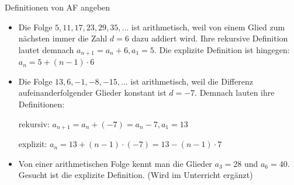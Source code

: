 \begin{bsp} {Definitionen von AF angeben}{}
    \begin{itemize}
        \item Die Folge $5,11,17,23,29,35,\dots $ ist arithmetisch, weil von einem Glied zum nächsten immer die Zahl $d=6$ dazu addiert wird.
        Ihre rekursive Definition lautet demnach $a_{n+1}=a_n + 6, a_1=5$. Die explizite Definition ist hingegen: $a_n=5+(n-1)\cdot 6$
        \item Die Folge $13,6,-1,-8,-15,\dots $ ist arithmetisch, weil die Differenz aufeinanderfolgender Glieder konstant ist $d=-7$. Demnach lauten ihre Definitionen:
        
        rekursiv:  $a_{n+1}=a_n+(-7)=a_n-7 ,   a_1=13$

        explizit: $a_n=13+(n-1)\cdot (-7)=13-(n-1)\cdot7$

        \item          
        Von einer arithmetischen Folge kennt man die Glieder $a_3=28$ und $a_6=40$. Gesucht ist die explizite Definition.  (Wird im Unterricht ergänzt)

        \vspace*{7cm}
        
        


\end{itemize}
\end{bsp}
